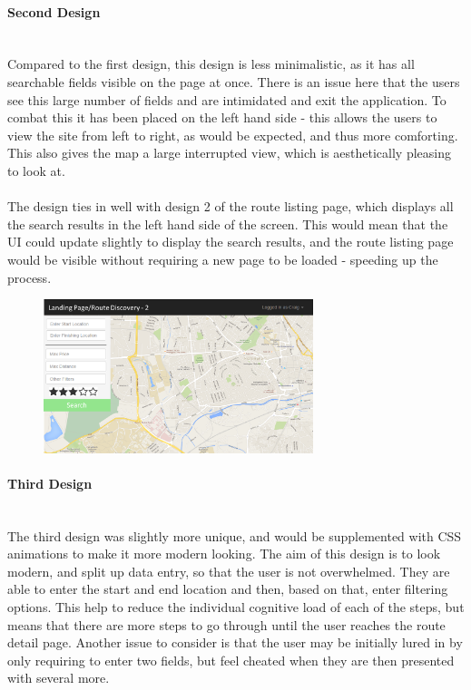 \documentclass[a4paper,twoside,notitlepage,11pt]{article}
\begin{document}
\paragraph{Second Design}\ \\
Compared to the first design, this design is less minimalistic, as it has all searchable fields visible on the page at once. There is an issue here that the users see this large number of fields and are intimidated and exit the application. To combat this it has been placed on the left hand side - this allows the users to view the site from left to right, as would be expected, and thus more comforting. This also gives the map a large interrupted view, which is aesthetically pleasing to look at.\ \\
\ \\
The design ties in well with design 2 of the route listing page, which displays all the search results in the left hand side of the screen. This would mean that the UI could update slightly to display the search results, and the route listing page would be visible without requiring a new page to be loaded - speeding up the process.
\begin{figure}[!ht]
	\begin{center}
		\includegraphics[width=0.70\textwidth]{images/ui-landing-2.png}
	\end{center}
	\vspace{-9mm}
\end{figure}

\paragraph{Third Design}\ \\
The third design was slightly more unique, and would be supplemented with CSS animations to make it more modern looking. The aim of this design is to look modern, and split up data entry, so that the user is not overwhelmed. They are able to enter the start and end location and then, based on that, enter filtering options. This help to reduce the individual cognitive load of each of the steps, but means that there are more steps to go through until the user reaches the route detail page. Another issue to consider is that the user may be initially lured in by only requiring to enter two fields, but feel cheated when they are then presented with several more.
\end{document}
